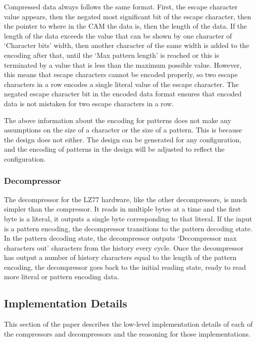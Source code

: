 \documentclass[doublespace,nopageskip]{VTthesis}
\begin{document}
Compressed data always follows the same format. First, the escape character value appears, then the negated most significant bit of the escape character, then the pointer to where in the CAM the data is, then the length of the data. If the length of the data exceeds the value that can be shown by one character of `Character bits' width, then another character of the same width is added to the encoding after that, until the `Max pattern length' is reached or this is terminated by a value that is less than the maximum possible value. However, this means that escape characters cannot be encoded properly, so two escape characters in a row encodes a single literal value of the escape character. The negated escape character bit in the encoded data format ensures that encoded data is not mistaken for two escape characters in a row.

The above information about the encoding for patterns does not make any assumptions on the size of a character or the size of a pattern. This is because the design does not either. The design can be generated for any configuration, and the encoding of patterns in the design will be adjusted to reflect the configuration.

\subsubsection{Decompressor}\label{sss:lz77_decompressor_design}
The decompressor for the LZ77 hardware, like the other decompressors, is much simpler than the compressor. It reads in multiple bytes at a time and the first byte is a literal, it outputs a single byte corresponding to that literal. If the input is a pattern encoding, the decompressor transitions to the pattern decoding state. In the pattern decoding state, the decompressor outputs `Decompressor max characters out' characters from the history every cycle. Once the decompressor has output a number of history characters equal to the length of the pattern encoding, the decompressor goes back to the initial reading state, ready to read more literal or pattern encoding data.

\subsection{Implementation Details}\label{se:lz77_implementation_details}
This section of the paper describes the low-level implementation details of each of the compressors and decompressors and the reasoning for those implementations.
\end{document}
